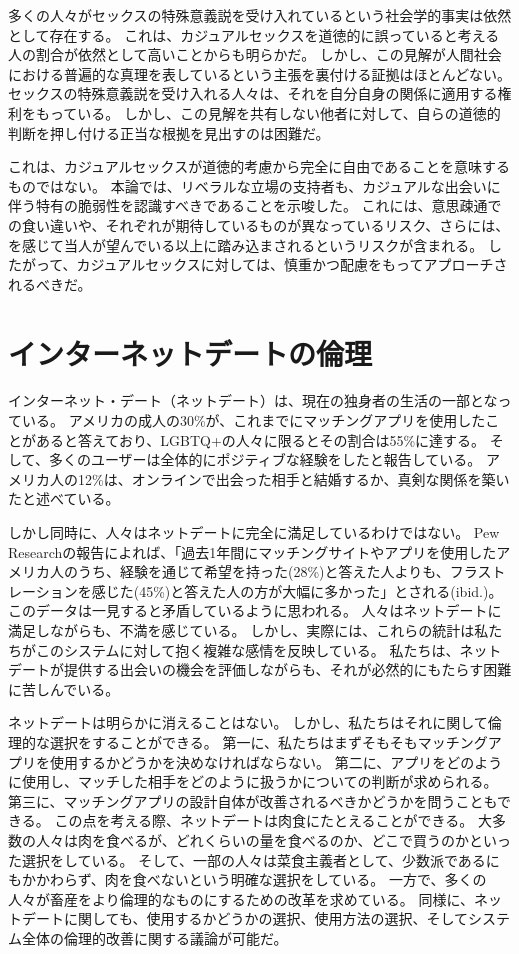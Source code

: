 \documentclass[paper=a4,book,openany]{jlreq} \usepackage{mystyle}
\begin{document}
多くの人々がセックスの特殊意義説を受け入れているという社会学的事実は依然として存在する。
これは、カジュアルセックスを道徳的に誤っていると考える人の割合が依然として高いことからも明らかだ。
しかし、この見解が人間社会における普遍的な真理を表しているという主張を裏付ける証拠はほとんどない。
セックスの特殊意義説を受け入れる人々は、それを自分自身の関係に適用する権利をもっている。
しかし、この見解を共有しない他者に対して、自らの道徳的判断を押し付ける正当な根拠を見出すのは困難だ。

これは、カジュアルセックスが道徳的考慮から完全に自由であることを意味するものではない。
本論では、リベラルな立場の支持者も、カジュアルな出会いに伴う特有の脆弱性を認識すべきであることを示唆した。
これには、意思疎通での食い違いや、それぞれが期待しているものが異なっているリスク、さらには、を感じて当人が望んでいる以上に踏み込まされるというリスクが含まれる。
したがって、カジュアルセックスに対しては、慎重かつ配慮をもってアプローチされるべきだ。

\section{インターネットデートの倫理}

インターネット・デート（ネットデート）は、現在の独身者の生活の一部となっている。
アメリカの成人の30\%が、これまでにマッチングアプリを使用したことがあると答えており、LGBTQ+の人々に限るとその割合は55\%に達する。
そして、多くのユーザーは全体的にポジティブな経験をしたと報告している。
アメリカ人の12\%は、オンラインで出会った相手と結婚するか、真剣な関係を築いたと述べている\citep{anderson20:_virt_down_onlin_datin}。

しかし同時に、人々はネットデートに完全に満足しているわけではない。
Pew Researchの報告によれば、「過去1年間にマッチングサイトやアプリを使用したアメリカ人のうち、経験を通じて希望を持った(28\%)と答えた人よりも、フラストレーションを感じた(45\%)と答えた人の方が大幅に多かった」とされる(ibid.)。
このデータは一見すると矛盾しているように思われる。
人々はネットデートに満足しながらも、不満を感じている。
しかし、実際には、これらの統計は私たちがこのシステムに対して抱く複雑な感情を反映している。
私たちは、ネットデートが提供する出会いの機会を評価しながらも、それが必然的にもたらす困難に苦しんでいる。

ネットデートは明らかに消えることはない。
しかし、私たちはそれに関して倫理的な選択をすることができる。
第一に、私たちはまずそもそもマッチングアプリを使用するかどうかを決めなければならない。
第二に、アプリをどのように使用し、マッチした相手をどのように扱うかについての判断が求められる。
第三に、マッチングアプリの設計自体が改善されるべきかどうかを問うこともできる。
この点を考える際、ネットデートは肉食にたとえることができる。
大多数の人々は肉を食べるが、どれくらいの量を食べるのか、どこで買うのかといった選択をしている。
そして、一部の人々は菜食主義者として、少数派であるにもかかわらず、肉を食べないという明確な選択をしている。
一方で、多くの人々が畜産をより倫理的なものにするための改革を求めている。
同様に、ネットデートに関しても、使用するかどうかの選択、使用方法の選択、そしてシステム全体の倫理的改善に関する議論が可能だ。
\end{document}
